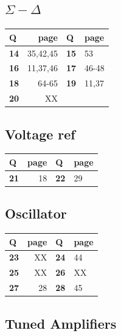\documentclass[
  a4paper,
]{article}
\begin{document}
\hypertarget{sigma---delta}{%
\subsection{\texorpdfstring{\(\Sigma - \Delta\)}{\textbackslash Sigma - \textbackslash Delta}}\label{sigma---delta}}

\begin{longtable}[]{@{}lrll@{}}
\toprule\noalign{}
Q & page & Q & page \\
\midrule\noalign{}
\endhead
\bottomrule\noalign{}
\endlastfoot
\textbf{14} & 35,42,45 & \textbf{15} & 53 \\
\textbf{16} & 11,37,46 & \textbf{17} & 46-48 \\
\textbf{18} & 64-65 & \textbf{19} & 11,37 \\
\textbf{20} & XX & & \\
\end{longtable}

\hypertarget{voltage-ref}{%
\subsection{Voltage ref}\label{voltage-ref}}

\begin{longtable}[]{@{}lrll@{}}
\toprule\noalign{}
Q & page & Q & page \\
\midrule\noalign{}
\endhead
\bottomrule\noalign{}
\endlastfoot
\textbf{21} & 18 & \textbf{22} & 29 \\
\end{longtable}

\hypertarget{oscillator}{%
\subsection{Oscillator}\label{oscillator}}

\begin{longtable}[]{@{}lrll@{}}
\toprule\noalign{}
Q & page & Q & page \\
\midrule\noalign{}
\endhead
\bottomrule\noalign{}
\endlastfoot
\textbf{23} & XX & \textbf{24} & 44 \\
\textbf{25} & XX & \textbf{26} & XX \\
\textbf{27} & 28 & \textbf{28} & 45 \\
\end{longtable}

\hypertarget{tuned-amplifiers}{%
\subsection{Tuned Amplifiers}\label{tuned-amplifiers}}
\end{document}
